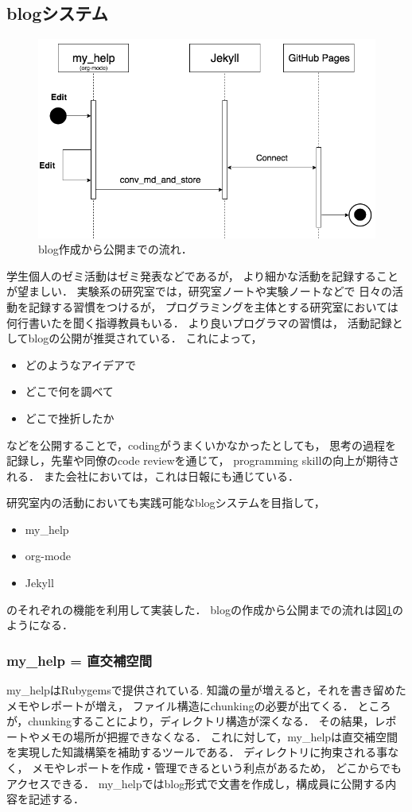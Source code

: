\documentclass{jsarticle}
\begin{document}
\subsection{blogシステム}
\label{sec:org85f3364}

\begin{figure}[btp]
\centering
\includegraphics[width=.9\linewidth]{./images/myhelp_to_jekyll.png}
\caption{\label{fig:org29c9e34}
blog作成から公開までの流れ．}
\end{figure}

学生個人のゼミ活動はゼミ発表などであるが，
より細かな活動を記録することが望ましい．
実験系の研究室では，研究室ノートや実験ノートなどで
日々の活動を記録する習慣をつけるが，
プログラミングを主体とする研究室においては
何行書いたを聞く指導教員もいる．
より良いプログラマの習慣は，
活動記録としてblogの公開が推奨されている．
これによって，
\begin{itemize}
\item どのようなアイデアで
\item どこで何を調べて
\item どこで挫折したか
\end{itemize}
などを公開することで，codingがうまくいかなかったとしても，
思考の過程を記録し，先輩や同僚のcode reviewを通じて，
programming skillの向上が期待される．
また会社においては，これは日報にも通じている．

研究室内の活動においても実践可能なblogシステムを目指して，
\begin{itemize}
\item my\_help
\item org-mode
\item Jekyll
\end{itemize}
のそれぞれの機能を利用して実装した．
blogの作成から公開までの流れは図\ref{fig:org29c9e34}のようになる．

\subsubsection{my\_help = 直交補空間}
\label{sec:orgb7e2107}
my\_helpはRubygemsで提供されている.
知識の量が増えると，それを書き留めたメモやレポートが増え，
ファイル構造にchunkingの必要が出てくる．
ところが，chunkingすることにより，ディレクトリ構造が深くなる．
その結果，レポートやメモの場所が把握できなくなる．
これに対して，my\_helpは直交補空間を実現した知識構築を補助するツールである．
ディレクトリに拘束される事なく，
メモやレポートを作成・管理できるという利点があるため，
どこからでもアクセスできる．
my\_helpではblog形式で文書を作成し，構成員に公開する内容を記述する．
\end{document}
